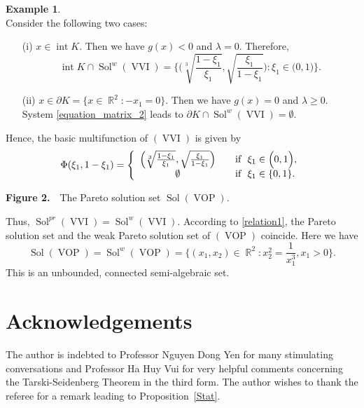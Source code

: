 \documentclass[]{interact}
\theoremstyle{plain}%
\theoremstyle{definition}
\newtheorem{example}{Example}[section]
\DeclareMathOperator{\Sol}{Sol}
\DeclareMathOperator{\VOP}{VOP}
\DeclareMathOperator{\R}{\mathbb{R}}
\DeclareMathOperator{\VVI}{VVI}
\DeclareMathOperator{\inte}{int}
\begin{document}
\begin{example}
\begin{equation}
	\end{equation}
	Consider the following two cases:
	\begin{enumerate}
		\item[(i)] $x\in \inte K$. Then we have $g(x)<0$ and $\lambda=0$. Therefore, 
		$$\inte K\cap\Sol^w(\VVI)=\Big\lbrace \Big(\sqrt[3]{\frac{1-\xi_1}{\xi_1}},\sqrt{\frac{\xi_1}{1-\xi_1}}\Big) :\xi_1\in \big(0,1\big)  \Big\rbrace.$$
		\item[(ii)] $x\in \partial K=\big\{x\in\R^2: -x_1=0\big\}$. Then we have $g(x)=0$ and $\lambda\geq 0$. System \eqref{equation_matrix_2} leads to
		$\partial K\cap\Sol^w(\VVI)=\emptyset.$
	\end{enumerate}
Hence, the basic multifunction of $(\VVI)$ is given by
	$$\Phi(\xi_1,1-\xi_1)=\left\{\begin{array}{cl}
	\left(\sqrt[3]{\frac{1-\xi_1}{\xi_1}},\sqrt{\frac{\xi_1}{1-\xi_1}}\right)  & \ \ \hbox{ if } \ \xi_1\in \Big(0,1\Big),  \\
	\emptyset & \ \ \hbox{ if } \ \xi_1\in\{0,1\} . \\
	\end{array}\right.$$
\begin{center}
		
		{\textbf{Figure 2.}\ \, The Pareto solution set $\Sol(\VOP)$.}
	\end{center}
	Thus, 	$\Sol^{pr}(\VVI)=\Sol^{w}(\VVI)$. According to \eqref{relation1}, the Pareto solution set and the weak Pareto solution set of $(\VOP)$ coincide. Here we have $$\Sol(\VOP)=\Sol^w(\VOP)=\Big\lbrace (x_1,x_2)\in \R^2: x_2^2=\frac{1}{x_1^3}, x_1>0\Big\rbrace .$$ 
This is an unbounded, connected semi-algebraic set. 
\end{example}

\section*{Acknowledgements}
	The author is indebted to Professor Nguyen Dong Yen for many stimulating conversations and Professor Ha Huy Vui for very helpful comments concerning the Tarski-Seidenberg Theorem in the third form.  The author wishes to thank the referee for a remark leading to Proposition~\ref{Stat}.
\end{document}
